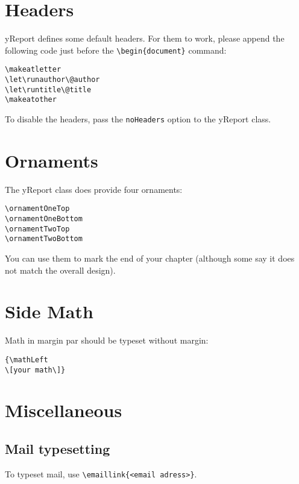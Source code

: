 \documentclass[a4paper, 11pt, oneside, fleqn]{article}
\begin{document}
	\section{Headers}
	yReport defines some default headers. For them to work, please append the following code just before the \lstinline|\begin{document}| command:
	\begin{lstlisting}
\makeatletter
\let\runauthor\@author
\let\runtitle\@title
\makeatother
	\end{lstlisting}
	To disable the headers, pass the \lstinline|noHeaders| option to the yReport class.
	
	
	\section{Ornaments}
	The yReport class does provide four ornaments:
	
	\begin{lstlisting}
\ornamentOneTop
\ornamentOneBottom
\ornamentTwoTop
\ornamentTwoBottom
	\end{lstlisting}
	
	You can use them to mark the end of your chapter (although some say it does not match the overall design).

	\section{Side Math}	
	Math in margin par should be typeset without margin:
	\begin{lstlisting}
{\mathLeft
\[your math\]}
	\end{lstlisting}
	
	
	\section{Miscellaneous}
	\subsection{Mail typesetting}
	To typeset mail, use \lstinline[breaklines]|\emaillink{<email adress>}|.
	
	
\end{document}
